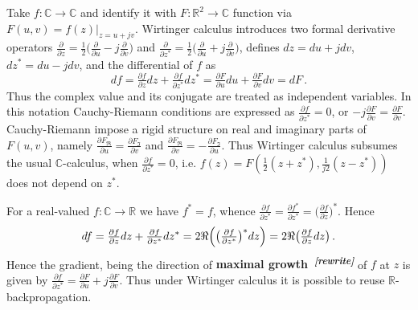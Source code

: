 \documentclass[a4paper,10pt]{article}
\newcommand{\attn}[2]{\textbf{\color{red} #2~\textsuperscript{\textit{[#1]}}}}
\newcommand{\rewrite}[1]{\attn{rewrite}{#1}}
\newcommand{\real}{\mathbb{R}}
\newcommand{\hop}{\ast}
\newcommand{\cplx}{\mathbb{C}}
\begin{document}
Take $f\colon \cplx \to \cplx$ and identify it with $F\colon \real^2 \to \cplx$ function
via $F(u, v) = f(z)\vert_{z=u + j v}$. Wirtinger calculus introduces two formal derivative
operators
$
  \tfrac{\partial}{\partial z}
    = \tfrac12 \bigl(
      \tfrac{\partial}{\partial u}
      - j \tfrac{\partial}{\partial v}
    \bigr)
$ and $
  \tfrac{\partial}{\partial z^\hop}
    = \tfrac12 \bigl(
      \tfrac{\partial}{\partial u}
      + j \tfrac{\partial}{\partial v}
    \bigr)
$, defines $dz = du + j dv$, $dz^\hop = du - j dv$, and the differential of $f$ as
$$
df = \tfrac{\partial f}{\partial z} dz
    + \tfrac{\partial f}{\partial z^\hop} dz^\hop
   = \tfrac{\partial F}{\partial u} du
     + \tfrac{\partial F}{\partial v} dv
   = dF
  \,. $$
Thus the complex value and its conjugate are treated as independent variables. In this notation
Cauchy-Riemann conditions are expressed as $
  \tfrac{\partial f}{\partial z^\hop} = 0
$, or $
  -j\tfrac{\partial F}{\partial v} = \tfrac{\partial F}{\partial v}
$. Cauchy-Riemann impose a rigid structure on real and imaginary parts of $F(u, v)$, namely $
  \tfrac{\partial F_{\Re }}{\partial u} = \tfrac{\partial F_{\Im }}{\partial v}
$ and $
  \tfrac{\partial F_{\Re }}{\partial v} = - \tfrac{\partial F_{\Im }}{\partial u}
$. Thus Wirtinger calculus subsumes the usual $\cplx$-calculus, when $
  \tfrac{\partial f}{\partial z^\hop} = 0
$, i.e. $
  f(z)
    = F(\tfrac12 (z + z^\hop), \tfrac1{j 2} (z - z^\hop))
$ does not depend on $z^\hop$.

For a real-valued $f\colon \cplx \to \real$ we have $f^\hop = f$, whence $
  \tfrac{\partial f}{\partial z^\hop}
    = \tfrac{\partial f^\hop}{\partial z^\hop}
    = \bigl(\tfrac{\partial f}{\partial z} \bigr)^\hop
$. Hence
$$
df
  = \tfrac{\partial f}{\partial z} dz
    + \tfrac{\partial f}{\partial z^\hop} dz^\hop
  = 2 \Re \Bigl(
    \bigl( \tfrac{\partial f}{\partial z^\hop} \bigr)^\hop dz
  \Bigr)
  = 2 \Re \bigl(
    \tfrac{\partial f}{\partial z} dz
  \bigr)
  \,. $$
Hence the gradient, being the direction of \rewrite{maximal growth} of $f$ at $z$ is given by $
  \tfrac{\partial f}{\partial z^\hop}
    = \tfrac{\partial F}{\partial u}
      + j \tfrac{\partial F}{\partial v}
$. Thus under Wirtinger calculus it is possible to reuse $\real$-backpropagation.
\end{document}
